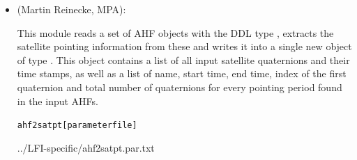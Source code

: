 \begin{itemize}
 is a C++ module which simulates the on-board
processing of PType 2 data and the subsequent decoding and
conversion to TOI in the DPC L1. In particular it
simulates the activity of PType 2 processing from PType 1 data.
The code accepts data in input of toi.science.Data type specified in
the LFI DDL (and built-in into the delivered DDL with LevelS from
ESTEC CVS). It is able to reproduce the creation of two sets of
differenced data with two different and known value
of the gain modulation factors (gmf1 and gmf2). This is
done in order to satisfy the constraints related to transmission
band-width from S/C to ground station.

\begin{alltt}
quantum [parameter file]
\end{alltt}
 {../LFI-specific/quantum.par.txt}

\item {} (Martin Reinecke, MPA):

This module reads a set of AHF objects with the DDL type
, extracts the satellite pointing information
from these and writes it into a single new object of type
.
This object contains a list of all input satellite quaternions and their time
stamps, as well as a list of name, start time, end time, index of the first
quaternion and total number of quaternions for every pointing period found in
the input AHFs.

\begin{alltt}
ahf2satpt [parameter file]
\end{alltt}
 {../LFI-specific/ahf2satpt.par.txt}
\end{itemize}
